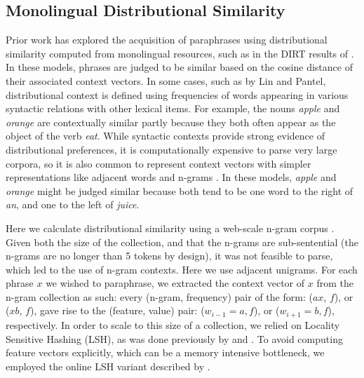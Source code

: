 \documentclass[11pt]{article}
\begin{document}

\subsection{Monolingual Distributional Similarity}\label{section:monolingual-distributional-similarity}
\label{sect:mds}

Prior work has explored the acquisition of paraphrases using distributional
similarity computed from monolingual resources, such as in the DIRT results of
. In these models, phrases are judged to be similar
based on the cosine distance of their associated context vectors. In some cases,
such as by Lin and Pantel, distributional context is defined using frequencies of words appearing in various syntactic relations with other lexical items. For example, the nouns \emph{apple} and \emph{orange}
are contextually similar partly because they both often appear as the object
of the verb \emph{eat}. While syntactic contexts provide strong evidence of
distributional preferences, it is computationally expensive to parse very large
corpora, so it is also common to represent context vectors with simpler
representations like adjacent words and n-grams \cite{ravichandranACL05}. In
these models, \emph{apple} and \emph{orange} might be judged similar because
both tend to be one word to the right of \emph{an}, and one to the left of
\emph{juice}.

Here we calculate distributional similarity using a web-scale n-gram corpus
\cite{GoogleNgrams,LinEtAlLREC10}. Given both the size of the collection, and
that the n-grams are sub-sentential (the n-grams are no longer than 5 tokens by
design), it was not feasible to parse, which led to the use of n-gram contexts.  Here we use adjacent unigrams.
For each phrase $x$ we wished to paraphrase, we extracted the context vector of
$x$ from the n-gram collection as such: every (n-gram, frequency) pair of the
form: ($a x$, $f$), or ($x b$, $f$), gave rise to the (feature, value) pair:
($w_{i-1}=a, f$), or ($w_{i+1}=b, f$), respectively. In order to scale to this
size of a collection, we relied on Locality Sensitive Hashing (LSH), as was done
previously by  and . To
avoid computing feature vectors explicitly, which can be a memory intensive
bottleneck, we employed the online LSH variant described by
.
\end{document}

